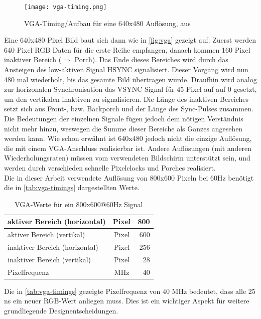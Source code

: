 \documentclass[a4paper,12pt,onesided]{report}
\begin{document}
\begin{figure}[H]
	\centering
	\texttt{[image: vga-timing.png]}
	\caption{VGA-Timing/Aufbau für eine 640x480 Auflösung, aus \cite{vga-timing}}
	\label{fig:vga}
\end{figure}

Eine 640x480 Pixel Bild baut sich dann wie in \autoref{fig:vga} gezeigt auf:
Zuerst werden 640 Pixel RGB Daten für die erste Reihe empfangen, danach kommen 160 Pixel inaktiver Bereich ($\Rightarrow$ Porch). Das Ende dieses Bereiches wird durch das Ansteigen des low-aktiven Signal HSYNC signalisiert. Dieser Vorgang wird nun 480 mal wiederholt, bis das gesamte Bild übertragen wurde. Draufhin wird analog zur horizonalen Synchronisation das VSYNC Signal für 45 Pixel auf auf 0 gesetzt, um den vertikalen inaktiven zu signalisieren. Die Länge des inaktiven Bereiches setzt sich aus Front-, bzw. Backporch und der Länge des Sync-Pulses zusammen. 
Die Bedeutungen der einzelnen Signale fügen jedoch dem nötigen Verständnis nicht mehr hinzu, weswegen die Summe dieser Bereiche als Ganzes angesehen werden kann.
Wie schon erwähnt ist 640x480 jedoch nicht die einzige Auflösung, die mit einem VGA-Anschluss realisierbar ist. Andere Auflösungen (mit anderen Wiederholungsraten) müssen vom verwendeten Bildschirm unterstützt sein, und werden durch verschieden schnelle Pixelclocks und Porches realisiert.\\
Die in dieser Arbeit verwendete Auflösung von 800x600 Pixeln bei 60Hz benötigt die in \autoref{tab:vga-timings} dargestellten Werte.

\begin{table}[H]
	\centering
	\begin{tabular}{|l|c|r|}	
		\hline
		aktiver Bereich (horizontal) & Pixel & 800 \\ \hline
		aktiver Bereich (vertikal) & Pixel & 600 \\ \hline
		inaktiver Bereich (horizontal) & Pixel & 256 \\ \hline
		inaktiver Bereich (vertikal) & Pixel & 28 \\ \hline
		Pixelfrequenz & MHz & 40 \\ \hline
	\end{tabular}
	\caption{VGA-Werte für ein 800x600@60Hz Signal}
	\label{tab:vga-timings}
\end{table}

Die in \autoref{tab:vga-timings} gezeigte Pixelfrequenz von 40 MHz bedeutet, dass alle 25 ns ein neuer RGB-Wert anliegen muss. Dies ist ein wichtiger Aspekt für weitere grundliegende Designentscheidungen.
\end{document}
